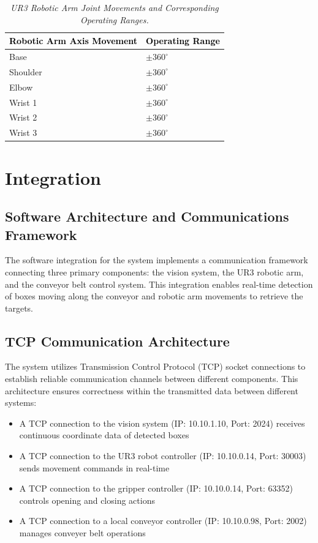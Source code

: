 \documentclass[a4paper, 10pt]{article}
\begin{document}
\renewcommand{\arraystretch}{1.1}
\begin{table}[h]
    \centering
    \caption{\textit{UR3 Robotic Arm Joint Movements and Corresponding Operating Ranges.}}
    \begin{tabular}{|C{7cm}|C{4cm}|}
        \hline
        \textcolor{black}{\textbf{Robotic Arm Axis Movement}} & \textcolor{black}{\textbf{Operating Range}} \\
        \hline
        Base   & $\pm 360^\circ$   \\
        \hline
        Shoulder     & $\pm 360^\circ$     \\
        \hline
        Elbow & $\pm 360^\circ$ \\
        \hline
        Wrist 1   & $\pm 360^\circ$   \\
        \hline
        Wrist 2   & $\pm 360^\circ$ \\
        \hline
        Wrist 3      & $\pm 360^\circ$   \\
        \hline
    \end{tabular}
    \label{tab:arm}
\end{table}


\newpage
\section{Integration}
\subsection{Software Architecture and Communications Framework}
The software integration for the system implements a communication framework connecting three primary components: the vision system, the UR3 robotic arm, and the conveyor belt control system. This integration enables real-time detection of boxes moving along the conveyor and robotic arm movements to retrieve the targets.
\subsection{TCP Communication Architecture}
The system utilizes Transmission Control Protocol (TCP) socket connections to establish reliable communication channels between different components. This architecture ensures correctness within the transmitted data between different systems:
\begin{itemize}
    \item A TCP connection to the vision system (IP: 10.10.1.10, Port: 2024) receives continuous coordinate data of detected boxes
    \item A TCP connection to the UR3 robot controller (IP: 10.10.0.14, Port: 30003) sends movement commands in real-time
    \item A TCP connection to the gripper controller (IP: 10.10.0.14, Port: 63352) controls opening and closing actions
    \item A TCP connection to a local conveyor controller (IP: 10.10.0.98, Port: 2002) manages conveyer belt operations
\end{itemize}
\end{document}

